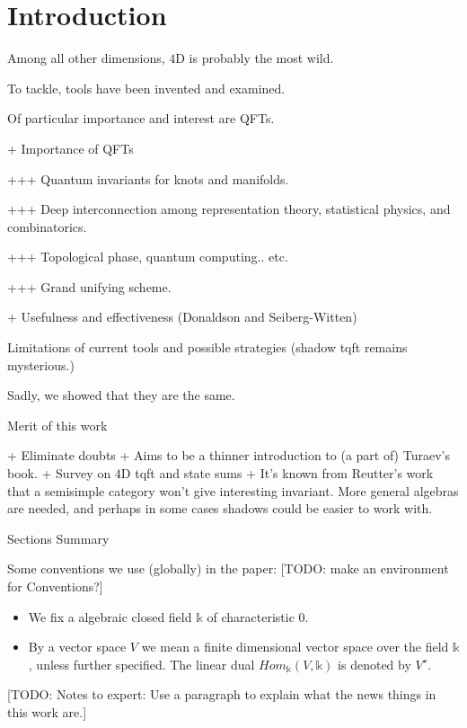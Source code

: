 \section{Introduction}

\noindent Among all other dimensions, $4$D is probably the most wild.

\noindent To tackle, tools have been invented and examined.

\noindent Of particular importance and interest are QFTs.

\noindent + Importance of QFTs

\noindent +++ Quantum invariants for knots and manifolds.

\noindent +++ Deep interconnection among representation theory, statistical
physics, and combinatorics.

\noindent +++ Topological phase, quantum computing.. etc.

\noindent +++ Grand unifying scheme.

\noindent + Usefulness and effectiveness (Donaldson and Seiberg-Witten)

\noindent Limitations of current tools and possible strategies (shadow tqft
remains mysterious.)

\noindent Sadly, we showed that they are the same.

\noindent Merit of this work

\noindent + Eliminate doubts
\noindent + Aims to be a thinner introduction to (a part of)
Turaev's book.
\noindent + Survey on $4$D tqft and state sums
\noindent + It's known from Reutter's work that a semisimple
category won't give interesting invariant. More general algebras
are needed, and perhaps in some cases shadows could be easier to
work with.

\noindent Sections Summary

\noindent Some conventions we use (globally) in the paper:
[TODO: make an environment for Conventions?]
\begin{itemize}
  \item We fix a algebraic closed field $\mathbb{k}$ of
        characteristic $0$.
  \item By a vector space $V$ we mean a finite dimensional vector
        space over the field $\mathbb{k}$, unless further
        specified. The linear dual
        $Hom_{\mathbb{k}}(V,\mathbb{k})$ is denoted by
        $V^{\star}$.
\end{itemize}

[TODO: Notes to expert: Use a paragraph to explain what the news
things in this work are.]

